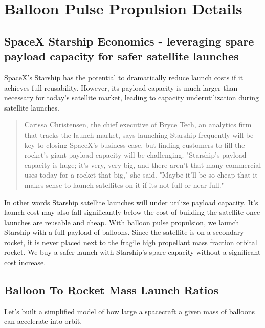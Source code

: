 \documentclass{article}
\begin{document}
\section{Balloon Pulse Propulsion Details}
\label{sec:pulse_propulsion_details}
\subsection{SpaceX Starship Economics - leveraging spare payload capacity for safer satellite launches}\label{sec:satellite_economics}
SpaceX’s Starship has the potential to dramatically reduce launch costs if it achieves full reusability. However, its payload capacity is much larger than necessary for today’s satellite market, leading to capacity underutilization during satellite launches.   \begin{quote}
Carissa Christensen,   the chief executive of Bryce Tech, an analytics firm that tracks the launch market, says launching Starship frequently will be key to closing SpaceX’s business case, but finding customers to fill the rocket’s giant payload capacity will be challenging. 
"Starship's payload capacity is huge; it's very, very big, and there aren't that many commercial uses today for a rocket that big," she said.  "Maybe it'll be so cheap that it makes sense to launch satellites on it if its not full or near full." \cite{nyt_starship_size} \end{quote}

In other words Starship satellite launches will under utilize payload capacity.   It's  launch cost may also fall significantly below the cost of building the satellite once launches are reusable and cheap.   With balloon pulse propulsion, we launch Starship with a full payload of balloons.   Since the satellite is on a secondary rocket, it is never placed next to the fragile high propellant mass fraction orbital rocket.   We buy a safer launch with Starship's spare capacity without a significant cost increase.

\subsection{Balloon To Rocket Mass Launch Ratios}\label{sec:balloon_rocket_ratio}
Let's built a simplified model of how large a spacecraft a given mass of balloons can accelerate into orbit.
\end{document}
